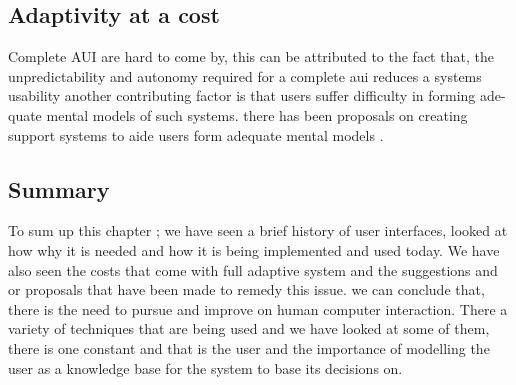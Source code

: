 \subsection{Adaptivity at a cost}
Complete AUI are hard to come by, this can be attributed to the fact that, the unpredictability and autonomy required for a complete aui reduces a systems usability 
another contributing factor is that users suffer difficulty in forming ade- quate mental models of such systems. there has been proposals on creating support systems to aide users form adequate mental models \cite{paymans2004usability}.
\subsection{Summary}
To sum up this chapter ; we have seen a brief history of user interfaces, looked at how why it is needed and how it is being implemented and used today. We have also seen the costs that come with full adaptive system and the suggestions and or proposals that have been made to remedy this issue. we can conclude that, there is the need to pursue and improve on human computer interaction. There a variety of techniques that are being used and we have looked at some of them, there is one constant and that is the user and the importance of modelling the user as a knowledge base for the system to base its decisions on.
